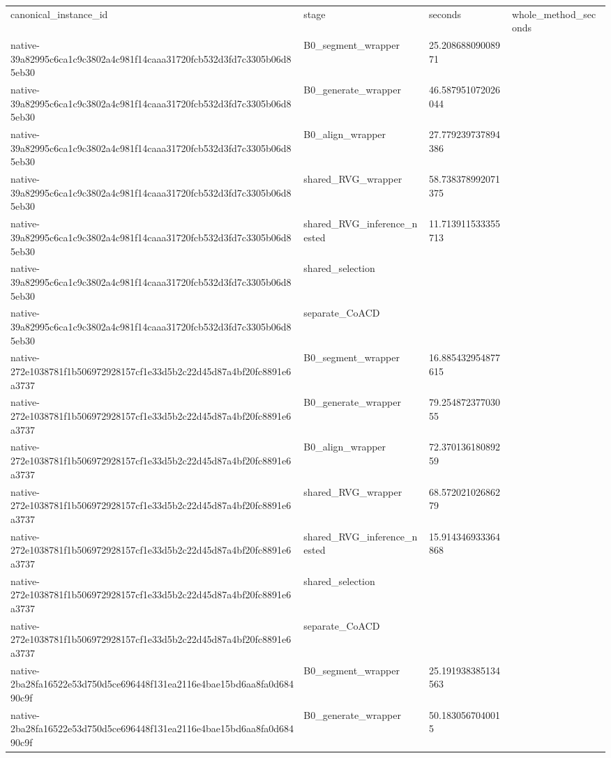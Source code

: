\begin{tabular}{llll}
canonical\_instance\_id & stage & seconds & whole\_method\_seconds \\
native-39a82995c6ca1c9c3802a4c981f14caaa31720fcb532d3fd7c3305b06d85eb30 & B0\_segment\_wrapper & 25.20868809008971 &  \\
native-39a82995c6ca1c9c3802a4c981f14caaa31720fcb532d3fd7c3305b06d85eb30 & B0\_generate\_wrapper & 46.587951072026044 &  \\
native-39a82995c6ca1c9c3802a4c981f14caaa31720fcb532d3fd7c3305b06d85eb30 & B0\_align\_wrapper & 27.779239737894386 &  \\
native-39a82995c6ca1c9c3802a4c981f14caaa31720fcb532d3fd7c3305b06d85eb30 & shared\_RVG\_wrapper & 58.738378992071375 &  \\
native-39a82995c6ca1c9c3802a4c981f14caaa31720fcb532d3fd7c3305b06d85eb30 & shared\_RVG\_inference\_nested & 11.713911533355713 &  \\
native-39a82995c6ca1c9c3802a4c981f14caaa31720fcb532d3fd7c3305b06d85eb30 & shared\_selection &  &  \\
native-39a82995c6ca1c9c3802a4c981f14caaa31720fcb532d3fd7c3305b06d85eb30 & separate\_CoACD &  &  \\
native-272e1038781f1b506972928157cf1e33d5b2c22d45d87a4bf20fc8891e6a3737 & B0\_segment\_wrapper & 16.885432954877615 &  \\
native-272e1038781f1b506972928157cf1e33d5b2c22d45d87a4bf20fc8891e6a3737 & B0\_generate\_wrapper & 79.25487237703055 &  \\
native-272e1038781f1b506972928157cf1e33d5b2c22d45d87a4bf20fc8891e6a3737 & B0\_align\_wrapper & 72.37013618089259 &  \\
native-272e1038781f1b506972928157cf1e33d5b2c22d45d87a4bf20fc8891e6a3737 & shared\_RVG\_wrapper & 68.57202102686279 &  \\
native-272e1038781f1b506972928157cf1e33d5b2c22d45d87a4bf20fc8891e6a3737 & shared\_RVG\_inference\_nested & 15.914346933364868 &  \\
native-272e1038781f1b506972928157cf1e33d5b2c22d45d87a4bf20fc8891e6a3737 & shared\_selection &  &  \\
native-272e1038781f1b506972928157cf1e33d5b2c22d45d87a4bf20fc8891e6a3737 & separate\_CoACD &  &  \\
native-2ba28fa16522e53d750d5ce696448f131ea2116e4bae15bd6aa8fa0d68490c9f & B0\_segment\_wrapper & 25.191938385134563 &  \\
native-2ba28fa16522e53d750d5ce696448f131ea2116e4bae15bd6aa8fa0d68490c9f & B0\_generate\_wrapper & 50.1830567040015 &  \\

\end{tabular}
